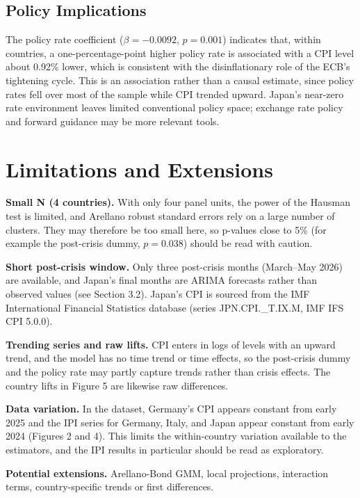\documentclass[11pt,a4paper]{article}
\let\oldsection\section
\renewcommand{\section}{\Needspace{6\baselineskip}\oldsection}
\begin{document}
\subsection{Policy Implications}
The policy rate coefficient ($\beta=-0.0092$, $p=0.001$) indicates that, within countries, a one-percentage-point higher policy rate is associated with a CPI level about 0.92\% lower, which is consistent with the disinflationary role of the ECB's tightening cycle. This is an association rather than a causal estimate, since policy rates fell over most of the sample while CPI trended upward. Japan's near-zero rate environment leaves limited conventional policy space; exchange rate policy and forward guidance may be more relevant tools.

\section{Limitations and Extensions}
\textbf{Small N (4 countries).} With only four panel units, the power of the Hausman test is limited, and Arellano robust standard errors rely on a large number of clusters. They may therefore be too small here, so p-values close to 5\% (for example the post-crisis dummy, $p=0.038$) should be read with caution.

\textbf{Short post-crisis window.} Only three post-crisis months (March--May 2026) are available, and Japan's final months are ARIMA forecasts rather than observed values (see Section 3.2). Japan's CPI is sourced from the IMF International Financial Statistics database (series JPN.CPI.\_T.IX.M, IMF IFS CPI 5.0.0).

\textbf{Trending series and raw lifts.} CPI enters in logs of levels with an upward trend, and the model has no time trend or time effects, so the post-crisis dummy and the policy rate may partly capture trends rather than crisis effects. The country lifts in Figure 5 are likewise raw differences.

\textbf{Data variation.} In the dataset, Germany's CPI appears constant from early 2025 and the IPI series for Germany, Italy, and Japan appear constant from early 2024 (Figures 2 and 4). This limits the within-country variation available to the estimators, and the IPI results in particular should be read as exploratory.

\textbf{Potential extensions.} Arellano-Bond GMM, local projections, interaction terms, country-specific trends or first differences.
\end{document}
